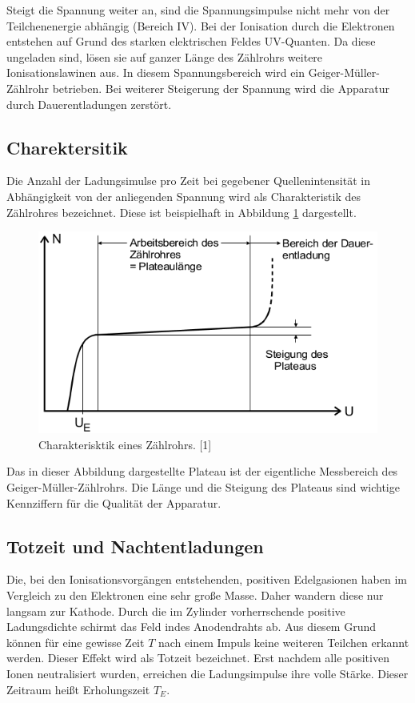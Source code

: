 \documentclass[11pt,ngerman,a4paper]{article}
\begin{document}
Steigt die Spannung weiter an, sind die Spannungsimpulse nicht mehr von der Teilchenenergie abhängig (Bereich IV). Bei der Ionisation durch die Elektronen entstehen auf Grund des starken elektrischen Feldes UV-Quanten. Da diese ungeladen sind, l\"osen sie auf ganzer Länge des Zählrohrs weitere Ionisationslawinen aus. In diesem Spannungsbereich wird ein Geiger-Müller-Zählrohr betrieben.
Bei weiterer Steigerung der Spannung wird die Apparatur durch Dauerentladungen zerstört.
\subsection{Charektersitik}
Die Anzahl der Ladungsimulse pro Zeit bei gegebener Quellenintensität in Abh\"angigkeit von der anliegenden Spannung wird als Charakteristik des Zählrohres bezeichnet. Diese ist beispielhaft in Abbildung \ref{abb3} dargestellt.
\begin{figure}[htp]
\centering
\includegraphics[scale=0.60]{abb3.png}
\caption{Charakterisktik eines Zählrohrs. [1]}
\label{abb3}
\end{figure}
Das in dieser Abbildung dargestellte Plateau ist der eigentliche Messbereich des Geiger-Müller-Zählrohrs. Die Länge und die Steigung des Plateaus sind wichtige Kennziffern für die Qualität der Apparatur.
 
\subsection{Totzeit und Nachtentladungen}

Die, bei den Ionisationsvorgängen entstehenden, positiven Edelgasionen haben im Vergleich zu den Elektronen eine sehr große Masse. Daher wandern diese nur langsam zur Kathode. Durch die im Zylinder vorherrschende positive Ladungsdichte schirmt das Feld indes Anodendrahts ab. Aus diesem Grund können für eine gewisse Zeit $T$ nach einem Impuls keine weiteren Teilchen erkannt werden. Dieser Effekt wird als Totzeit bezeichnet. Erst nachdem alle positiven Ionen neutralisiert wurden, erreichen die Ladungsimpulse ihre volle Stärke. Dieser Zeitraum heißt Erholungszeit $T_E$.
\end{document}
